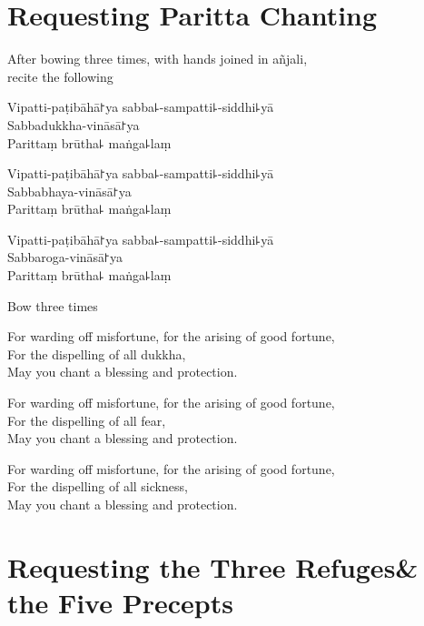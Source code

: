 \clearpage
\chapter{Requesting Paritta Chanting}%

\begin{instruction}
  After bowing three times, with hands joined in añjali,\\
  recite the following
\end{instruction}

Vipatti-paṭibāhā꜓ya sabba꜕-sampatti꜕-siddhi꜕yā\\
Sabbadukkha-vināsā꜓ya\\
Parittaṃ brūtha꜕ maṅga꜕laṃ

Vipatti-paṭibāhā꜓ya sabba꜕-sampatti꜕-siddhi꜕yā\\
Sabbabhaya-vināsā꜓ya\\
Parittaṃ brūtha꜕ maṅga꜕laṃ

Vipatti-paṭibāhā꜓ya sabba꜕-sampatti꜕-siddhi꜕yā\\
Sabbaroga-vināsā꜓ya\\
Parittaṃ brūtha꜕ maṅga꜕laṃ

\begin{instruction}
  Bow three times
\end{instruction}

\begin{english}
For warding off misfortune, for the arising of good fortune,\\
For the dispelling of all dukkha,\\
May you chant a blessing and protection.

For warding off misfortune, for the arising of good fortune,\\
For the dispelling of all fear,\\
May you chant a blessing and protection.

For warding off misfortune, for the arising of good fortune,\\
For the dispelling of all sickness,\\
May you chant a blessing and protection.
\end{english}

\setlength{\englishIndent}{\leaderIndent}

\clearpage
\chapter[Three Refuges \& the Five Precepts]{Requesting the Three Refuges\newline \& the Five Precepts}%

